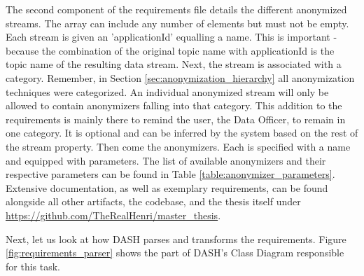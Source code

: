 The second component of the requirements file details the different anonymized streams. The array can include any number of elements but must not be empty. Each stream is given an 'applicationId' equalling a name. This is important - because the combination of the original topic name with applicationId is the topic name of the resulting data stream. Next, the stream is associated with a category. Remember, in Section \ref{sec:anonymization_hierarchy} all anonymization techniques were categorized. An individual anonymized stream will only be allowed to contain anonymizers falling into that category. This addition to the requirements is mainly there to remind the user, the Data Officer, to remain in one category. It is optional and can be inferred by the system based on the rest of the stream property. Then come the anonymizers. Each is specified with a name and equipped with parameters. The list of available anonymizers and their respective parameters can be found in Table \ref{table:anonymizer_parameters}. Extensive documentation, as well as exemplary requirements, can be found alongside all other artifacts, the codebase, and the thesis itself under \url{https://github.com/TheRealHenri/master_thesis}. \par
Next, let us look at how \ac{DASH} parses and transforms the requirements. Figure \ref{fig:requirements_parser} shows the part of \ac{DASH}'s Class Diagram responsible for this task.\par

